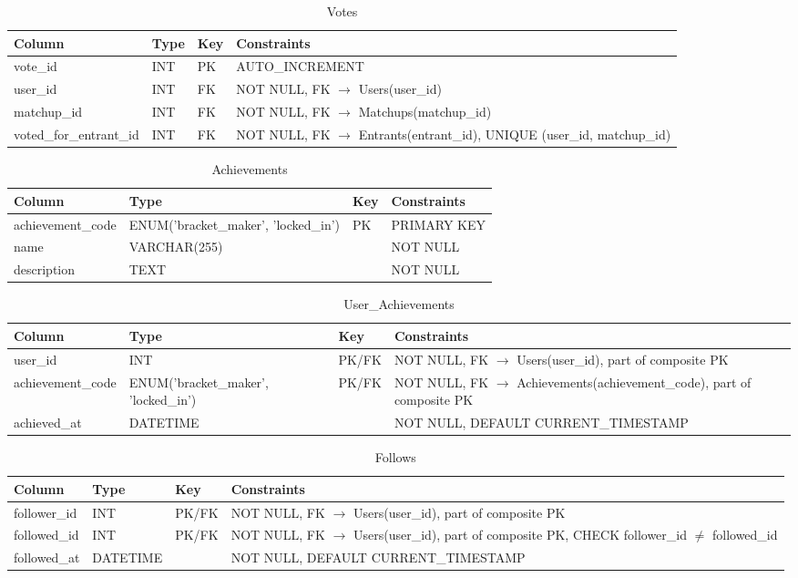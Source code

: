 \documentclass[11pt]{article}
\begin{document}
\begin{table}[ht]
\centering
\caption{Votes}
\begin{tabular}{|p{3.2cm}|p{3.8cm}|p{1.2cm}|p{5.3cm}|}
\hline
Column & Type & Key & Constraints \\ \hline
vote\_id & INT & PK & AUTO\_INCREMENT \\ \hline
user\_id & INT & FK & NOT NULL, FK $\rightarrow$ Users(user\_id) \\ \hline
matchup\_id & INT & FK & NOT NULL, FK $\rightarrow$ Matchups(matchup\_id) \\ \hline
voted\_for\_entrant\_id & INT & FK & NOT NULL, FK $\rightarrow$ Entrants(entrant\_id), UNIQUE (user\_id, matchup\_id) \\ \hline
\end{tabular}
\end{table}

\begin{table}[ht]
\centering
\caption{Achievements}
\begin{tabular}{|p{3.2cm}|p{3.8cm}|p{1.2cm}|p{5.3cm}|}
\hline
Column & Type & Key & Constraints \\ \hline
achievement\_code & ENUM('bracket\_maker', 'locked\_in') & PK & PRIMARY KEY \\ \hline
name & VARCHAR(255) &  & NOT NULL \\ \hline
description & TEXT &  & NOT NULL \\ \hline
\end{tabular}
\end{table}

\begin{table}[ht]
\centering
\caption{User\_Achievements}
\begin{tabular}{|p{3.2cm}|p{3.8cm}|p{1.2cm}|p{5.3cm}|}
\hline
Column & Type & Key & Constraints \\ \hline
user\_id & INT & PK/FK & NOT NULL, FK $\rightarrow$ Users(user\_id), part of composite PK \\ \hline
achievement\_code & ENUM('bracket\_maker', 'locked\_in') & PK/FK & NOT NULL, FK $\rightarrow$ Achievements(achievement\_code), part of composite PK \\ \hline
achieved\_at & DATETIME &  & NOT NULL, DEFAULT CURRENT\_TIMESTAMP \\ \hline
\end{tabular}
\end{table}

\begin{table}[ht]
\centering
\caption{Follows}
\begin{tabular}{|p{3.2cm}|p{3.8cm}|p{1.2cm}|p{5.3cm}|}
\hline
Column & Type & Key & Constraints \\ \hline
follower\_id & INT & PK/FK & NOT NULL, FK $\rightarrow$ Users(user\_id), part of composite PK \\ \hline
followed\_id & INT & PK/FK & NOT NULL, FK $\rightarrow$ Users(user\_id), part of composite PK, CHECK follower\_id $\ne$ followed\_id \\ \hline
followed\_at & DATETIME &  & NOT NULL, DEFAULT CURRENT\_TIMESTAMP \\ \hline
\end{tabular}
\end{table}
\end{document}
